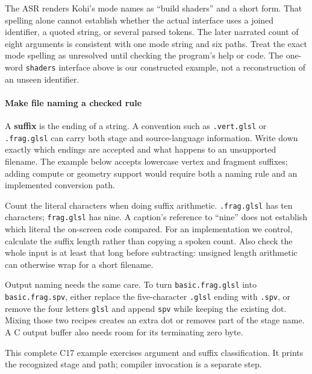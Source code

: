 The ASR renders Kohi's mode names as ``build shaders'' and a short form. That spelling alone cannot establish whether the actual interface uses a joined identifier, a quoted string, or several parsed tokens. The later narrated count of eight arguments is consistent with one mode string and six paths. Treat the exact mode spelling as unresolved until checking the program's help or code. The one-word \texttt{shaders} interface above is our constructed example, not a reconstruction of an unseen identifier.

\paragraph{Make file naming a checked rule}\label{05-engine-i-ch013-make-file-naming-a-checked-rule}

A \textbf{suffix} is the ending of a string. A convention such as \texttt{.vert.glsl} or \texttt{.frag.glsl} can carry both stage and source-language information. Write down exactly which endings are accepted and what happens to an unsupported filename. The example below accepts lowercase vertex and fragment suffixes; adding compute or geometry support would require both a naming rule and an implemented conversion path.

Count the literal characters when doing suffix arithmetic. \texttt{.frag.glsl} has ten characters; \texttt{frag.glsl} has nine. A caption's reference to ``nine'' does not establish which literal the on-screen code compared. For an implementation we control, calculate the suffix length rather than copying a spoken count. Also check the whole input is at least that long before subtracting: unsigned length arithmetic can otherwise wrap for a short filename.

Output naming needs the same care. To turn \texttt{basic.frag.glsl} into \texttt{basic.frag.spv}, either replace the five-character \texttt{.glsl} ending with \texttt{.spv}, or remove the four letters \texttt{glsl} and append \texttt{spv} while keeping the existing dot. Mixing those two recipes creates an extra dot or removes part of the stage name. A C output buffer also needs room for its terminating zero byte.

This complete C17 example exercises argument and suffix classification. It prints the recognized stage and path; compiler invocation is a separate step.


